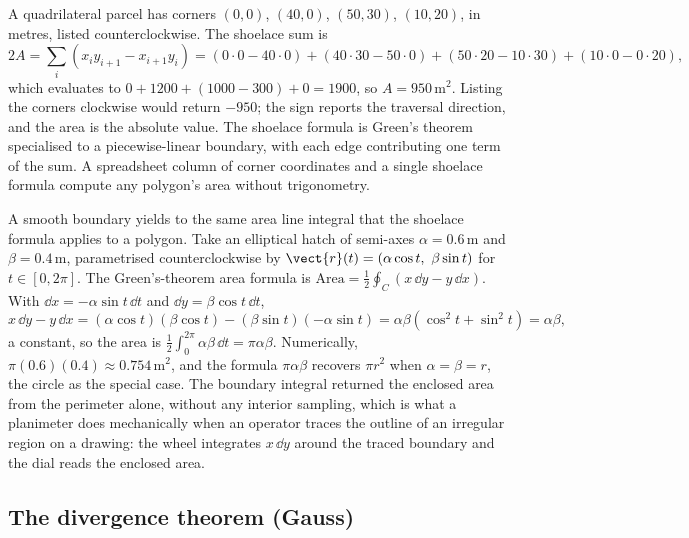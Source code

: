 \begin{example}
A quadrilateral parcel has corners $(0, 0)$, $(40, 0)$, $(50, 30)$,
$(10, 20)$, in metres, listed counterclockwise. The shoelace sum is
\[
2A = \sum_{i}(x_{i}y_{i+1} - x_{i+1}y_{i}) =
(0\cdot 0 - 40\cdot 0) + (40\cdot 30 - 50\cdot 0) +
(50\cdot 20 - 10\cdot 30) + (10\cdot 0 - 0\cdot 20),
\]
which evaluates to $0 + 1200 + (1000 - 300) + 0 = 1900$, so
$A = 950\,\si{\meter\squared}$. Listing the corners clockwise would
return $-950$; the sign reports the traversal direction, and the area
is the absolute value. The shoelace formula is Green's theorem
specialised to a piecewise-linear boundary, with each edge
contributing one term of the sum. A spreadsheet column of corner
coordinates and a single shoelace formula compute any polygon's area
without trigonometry.
\end{example}

\begin{example}
A smooth boundary yields to the same area line integral that the
shoelace formula applies to a polygon. Take an elliptical hatch of
semi-axes $\alpha = 0.6\,\si{\meter}$ and $\beta = 0.4\,\si{\meter}$,
parametrised counterclockwise by $\vect{r}(t) = (\alpha\cos t,\
\beta\sin t)$ for $t \in [0, 2\pi]$. The Green's-theorem area formula
is $\text{Area} = \tfrac{1}{2}\oint_{C}(x\,\dd y - y\,\dd x)$. With
$\dd x = -\alpha\sin t\,\dd t$ and $\dd y = \beta\cos t\,\dd t$,
\[
x\,\dd y - y\,\dd x = (\alpha\cos t)(\beta\cos t) - (\beta\sin t)
(-\alpha\sin t) = \alpha\beta(\cos^{2} t + \sin^{2} t) = \alpha\beta,
\]
a constant, so the area is $\tfrac{1}{2}\int_{0}^{2\pi}\alpha\beta\,
\dd t = \pi\alpha\beta$. Numerically, $\pi(0.6)(0.4) \approx 0.754\,
\si{\meter\squared}$, and the formula $\pi\alpha\beta$ recovers
$\pi r^{2}$ when $\alpha = \beta = r$, the circle as the special case.
The boundary integral returned the enclosed area from the perimeter
alone, without any interior sampling, which is what a planimeter does
mechanically when an operator traces the outline of an irregular region
on a drawing: the wheel integrates $x\,\dd y$ around the traced
boundary and the dial reads the enclosed area.
\end{example}

\subsection{The divergence theorem (Gauss)}

